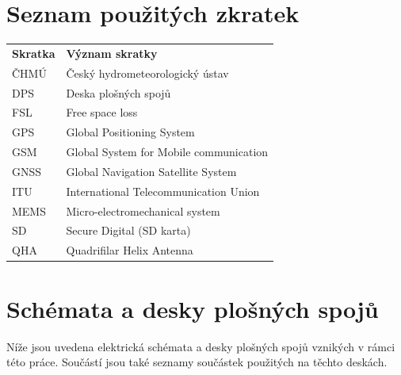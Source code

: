 \documentclass[twoside]{ctuthesis}
\theoremstyle{plain}
\theoremstyle{definition}
\theoremstyle{note}
\begin{document}
%
%
\appendix
\chapter*{Seznam použitých zkratek}
\noindent


\begin{tabularx}{\linewidth}
{ l >{\raggedright\arraybackslash}X }
\bfseries Skratka & \bfseries Význam skratky \\\Midrule
ČHMÚ & Český hydrometeorologický ústav\\
DPS & Deska plošných spojů\\
FSL & Free space loss\\
GPS & Global Positioning System\\
GSM &Global System for Mobile communication\\
GNSS &Global Navigation Satellite System\\
ITU & International Telecommunication Union\\
MEMS & Micro-electromechanical system\\
SD & Secure Digital (SD karta)\\
QHA & Quadrifilar Helix Antenna\\
\end{tabularx}

\chapter*{Schémata a desky plošných spojů}
Níže jsou uvedena elektrická schémata a desky plošných spojů vznikých v rámci této práce. Součástí jsou také seznamy součástek použitých na těchto deskách.





\end{document}
